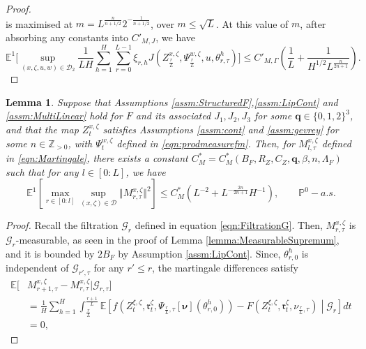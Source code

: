 \documentclass{article}
\newtheorem{lemma}[theorem]{Lemma}
\begin{document}
\begin{appendices}
\begin{proof}
\[\]
is maximised at $m= L^{\frac{n}{n+1/2}}2^{-\frac{1}{n+1/2}}$, over $m\le \sqrt{L}$. At this value of $m$, after absorbing any constants into $C'_{M,J}$, we have
\[
\mathbb E^1 \bigg[\sup_{(x,\zeta,u, w) \in \mathscr D_2}\frac{1}{LH}\sum_{h=1}^H \sum_{r=0}^{L-1}\xi_{r,h}J(Z^{x,\zeta}_\frac{r}{L},\Psi^{w,\zeta}_\frac{r}{L},u,\theta^h_{r,\tau})\bigg] \le C'_{M,\Gamma} \left( \frac{1}{L}+\frac{1}{H^{1/2}L^{\frac{n}{2n+1}}}\right).
\]
\end{proof}
\begin{lemma}\label{lemma:doobL2}
Suppose that Assumptions  \ref{assm:StructuredF},\ref{assm:LipCont} and \ref{assm:MultiLinear} hold for $F$ and its associated $J_1,J_2,J_3$ for some $\bm q\in \{0,1,2\}^3$, and that the map $Z^{x,\zeta}_t$ satisfies Assumptions \ref{assm:cont} and \ref{assm:gevrey} for some $n\in \mathbb Z_{>0}$, with $\Psi^{w,\zeta}_t$ defined in \eqref{eqn:prodmeasurefm}. Then, for $M^{x,\zeta}_{l,\tau}$ defined in \eqref{eqn:Martingale},
there exists a constant $C_M^*=C_M^* (B_F,R_Z,C_Z,\bm q,\beta,n,\Lambda_F)$ such that for any $l\in[0:L]$, we have
    \[
    \mathbb E^1 \left[\max_{r\in[0:l]}\sup_{(x,\zeta)\in \mathscr D} \Vert M^{x,\zeta}_{r,\tau}\Vert^2\right]\le C^*_{M}\left(L^{-2} + L^{-\frac{2n}{2n+1}}H^{-1}\right), \qquad \mathbb P^0-a.s.
    \]
\end{lemma}
\begin{proof}
Recall the filtration $\mathcal G_{r}$ defined in equation \eqref{eqn:FiltrationG}.
    Then, $M^{x,\zeta}_{r,\tau}$ is $\mathcal G_{r}$-measurable, as seen in the proof of Lemma \ref{lemma:MeasurableSupremum}, and it is bounded by $2B_F$ by Assumption \ref{assm:LipCont}. Since, $\theta^h_{r,0}$ is independent of $\mathcal G_{r',\tau}$ for any $r'\le r$, the martingale differences satisfy
    \begin{align*}
    \mathbb E \big[ &M^{x,\zeta}_{r+1,\tau}-M^{x,\zeta}_{r,\tau}\big| \mathcal G_{r,\tau}\big]\\&= \frac{1}{H}\sum_{h=1}^H\int_{\frac{r}{L}}^\frac{r+1}{L} \mathbb E\left[ f(Z^{\xi,\zeta}_t,\mathfrak{r}^{\zeta}_t,\Psi_{\frac{r}{L},\tau}[\bm\nu](\theta^h_{r,0}))- F(Z^{\xi,\zeta}_t,\mathfrak{r}^{\zeta}_t,\nu_{\frac{r}{L},\tau})\middle|\mathcal G_{r}\right]dt\\&=0, 

\end{align*}
\end{proof}
\end{appendices}
\end{document}
